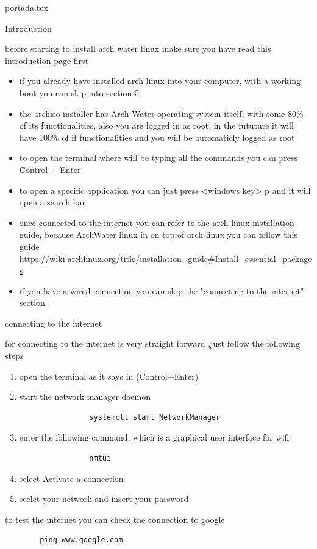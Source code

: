 
{portada.tex}
\newpage
\tableofcontents
\printindex
\newpage
\begin{section}{Introduction}
	\begin{center}
		\begin{Large}
			before starting to install arch water linux make sure you have read this introduction page first
		\end{Large}
	\end{center}
	\begin{itemize}
		\item 
			if you already have installed arch linux into your computer, with a working boot you can skip into section 5
		\item
			the archiso installer has Arch Water operating system itself, with some 80\% of its functionalities, 
			also you are logged in as root, in the fututure it will have 100\% of if functionalities and you will be automaticly logged as root
		\item
			to open the terminal where will be typing all the commands you can press Control + Enter
		\item 
			to open a specific application you can just press <windows key> p and it will open a search bar
		\item
			once connected to the internet you can refer to the arch linux installation guide, because ArchWater linux in on top of arch linux you can follow this guide
			\url{https://wiki.archlinux.org/title/installation_guide#Install_essential_packages}
		\item 
			if you have a wired connection you can skip the "connecting to the internet" section
	\end{itemize}
\end{section}
\newpage
\begin{section}{connecting to the internet}
	\begin{Large}
		for connecting to the internet is very straight forward
		,just follow the following steps
	\end{Large}
	\begin{enumerate}
		\item 
			open the terminal as it says in (Control+Enter)
		\item
			start the network manager daemon
			\begin{verbatim}
				systemctl start NetworkManager
			\end{verbatim}
		\item
			enter the following command, which is a graphical user interface for wifi
			\begin{verbatim}
				nmtui
			\end{verbatim}
		\item 
			select Activate a connection
		\item 
			seelct your network and insert your password

	\end{enumerate}
	to test the internet you can check the connection to google
	\begin{verbatim}
		ping www.google.com
	\end{verbatim}
\end{section}

